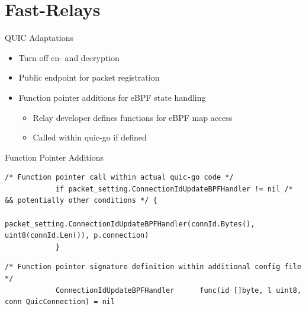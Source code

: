 \documentclass[shortpres,aspectratio=43]{beamer}
\newlength{\mylength}
\begin{document}

\section{Fast-Relays}

\begin{frame}{}
  \tableofcontents[currentsection]
\end{frame}

\begin{frame}{QUIC Adaptations}
    \begin{minipage}{\textwidth}
        \begin{itemize}
            \item Turn off en- and decryption
            \vspace{2\mylength}
            \item Public endpoint for packet registration
            \vspace{2\mylength}
            \item Function pointer additions for eBPF state handling
            \vspace{2\mylength}
            \begin{itemize}
                \item Relay developer defines functions for eBPF map access
                \vspace{2\mylength}
                \item Called within quic-go if defined
            \end{itemize}
        \end{itemize}
    \end{minipage}
\end{frame}

\begin{frame}[fragile]{Function Pointer Additions}
    \begin{minipage}{\textwidth}
        \begin{lstlisting}[style=GoStyle,
            caption=Function-pointer addition to the quic-go library.]
            /* Function pointer call within actual quic-go code */
            if packet_setting.ConnectionIdUpdateBPFHandler != nil /* && potentially other conditions */ {
                packet_setting.ConnectionIdUpdateBPFHandler(connId.Bytes(), uint8(connId.Len()), p.connection)
            }
        \end{lstlisting}
    \end{minipage}

    \begin{minipage}{\textwidth}
        \begin{lstlisting}[style=GoStyle, caption=The signature will be defined within the library itself.]
            /* Function pointer signature definition within additional config file */
            ConnectionIdUpdateBPFHandler      func(id []byte, l uint8, conn QuicConnection) = nil
        \end{lstlisting}
    \end{minipage}
\end{frame}
\end{document}
